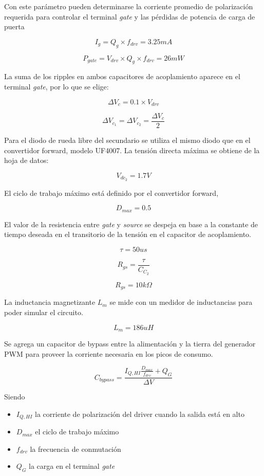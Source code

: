 Con este parámetro pueden determinarse la corriente promedio de polarización requerida para controlar el terminal \textit{gate} 
y las pérdidas de potencia de carga de puerta

$$ I_g=Q_g\times f_{drv}=3.25mA $$

$$ P_{gate}=V_{drv}\times Q_g\times f_{drv}=26mW $$


La suma de los ripples en ambos capacitores de acoplamiento aparece en el terminal \textit{gate},
por lo que se elige:

$$ \Delta V_c=0.1\times V_{drv} $$

$$ \Delta V_{c_1}=\Delta V_{c_2}=\frac{\Delta V_c}{2} $$

Para el diodo de rueda libre del secundario se utiliza el mismo diodo que en el convertidor forward, modelo UF4007. 
La tensión directa máxima se obtiene de la hoja de datos: 

$$ V_{dc_2}=1.7V $$

El ciclo de trabajo máximo está definido por el convertidor forward, 

$$ D_{max}=0.5 $$

El valor de la resistencia entre \textit{gate} y \textit{source} se despeja en base a la constante de tiempo deseada en el transitorio de la tensión en el capacitor de acoplamiento.

$$ \tau=50us $$


$$ R_{gs}=\frac{\tau}{C_{C_2}} $$

$$ R_{gs}=10k\Omega $$

La inductancia magnetizante $L_m$ se mide con un medidor de inductancias para poder simular el circuito.

$$ L_m=186uH $$



Se agrega un capacitor de bypass entre la alimentación y la tierra del generador PWM para proveer la corriente necesaria en los picos de consumo.


$$ C_{bypass}=\frac{I_{Q,HI}\frac{D_{max}}{f_{drv}}+Q_G}{\Delta V} $$

Siendo

\begin{itemize}
    \item $I_{Q,HI}$ la corriente de polarización del driver cuando la salida está en alto
    \item $D_{max}$ el ciclo de trabajo máximo
    \item $f_{drv}$ la frecuencia de conmutación
    \item $Q_G$ la carga en el terminal \textit{gate}
\end{itemize}

